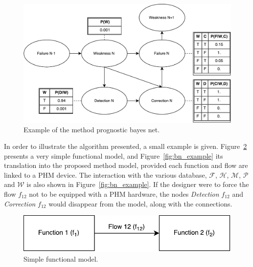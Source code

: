 \begin{figure}[H]
\centering
\includegraphics[scale=.6]{fig/cptex}
\caption{Example of the method prognostic bayes net.}
\label{fig:cptex}
\end{figure}


In order to illustrate the algorithm presented, a small example is given. Figure~\ref{fig:fm} presents a very simple functional model, and Figure~\ref{fig:bn_example} its translation into the proposed method model, provided each function and flow are linked to a PHM device. The interaction with the various database, $\mathscr{F}$, $\mathscr{H}$, $\mathscr{M}$, $\mathscr{P}$ and $\mathscr{W}$ is also shown in Figure~\ref{fig:bn_example}. If the designer were to force the flow $f_{12}$ not to be equipped with a PHM hardware, the nodes \textit{Detection} $f_{12}$ and \textit{Correction} $f_{12}$ would disappear from the model, along with the connections.


\begin{figure}[H]
\centering
\includegraphics[scale=.5]{fig/fm}
\caption{Simple functional model.}
\label{fig:fm}
\end{figure}



